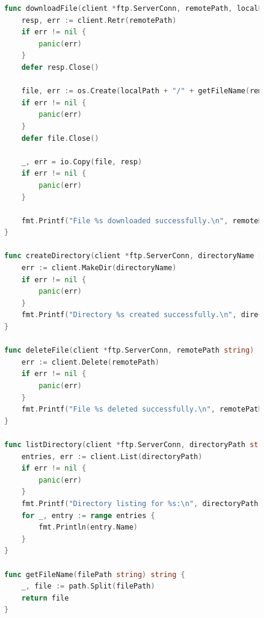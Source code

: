 \documentclass[a4paper, 14pt]{extarticle}
\begin{document}
\newpage
\begin{figure}[!htb]
\begin{lstlisting}[language={Go},caption={client.go - продолжение},label={lst:code3}]
func downloadFile(client *ftp.ServerConn, remotePath, localPath string) {
	resp, err := client.Retr(remotePath)
	if err != nil {
		panic(err)
	}
	defer resp.Close()

	file, err := os.Create(localPath + "/" + getFileName(remotePath))
	if err != nil {
		panic(err)
	}
	defer file.Close()

	_, err = io.Copy(file, resp)
	if err != nil {
		panic(err)
	}

	fmt.Printf("File %s downloaded successfully.\n", remotePath)
}

func createDirectory(client *ftp.ServerConn, directoryName string) {
	err := client.MakeDir(directoryName)
	if err != nil {
		panic(err)
	}
	fmt.Printf("Directory %s created successfully.\n", directoryName)
}

func deleteFile(client *ftp.ServerConn, remotePath string) {
	err := client.Delete(remotePath)
	if err != nil {
		panic(err)
	}
	fmt.Printf("File %s deleted successfully.\n", remotePath)
}

func listDirectory(client *ftp.ServerConn, directoryPath string) {
	entries, err := client.List(directoryPath)
	if err != nil {
		panic(err)
	}
	fmt.Printf("Directory listing for %s:\n", directoryPath)
	for _, entry := range entries {
		fmt.Println(entry.Name)
	}
}

func getFileName(filePath string) string {
	_, file := path.Split(filePath)
	return file
}
\end{lstlisting}
\end{figure}
\end{document}
